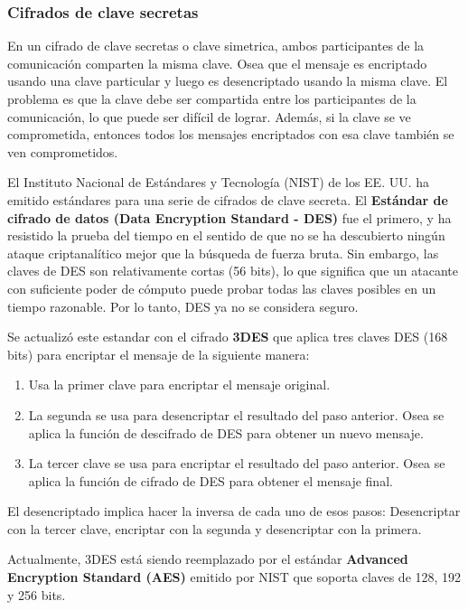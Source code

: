 \subsubsection{Cifrados de clave secretas}
En un cifrado de clave secretas o clave simetrica, ambos participantes de la comunicación comparten la misma clave. Osea que el mensaje es encriptado usando una clave particular y luego es desencriptado usando la misma clave. El problema es que la clave debe ser compartida entre los participantes de la comunicación, lo que puede ser difícil de lograr. Además, si la clave se ve comprometida, entonces todos los mensajes encriptados con esa clave también se ven comprometidos.

El Instituto Nacional de Estándares y Tecnología (NIST) de los EE. UU. ha emitido estándares para una serie de cifrados de clave secreta. El \textbf{Estándar de cifrado de datos (Data Encryption Standard - DES)} fue el primero, y ha resistido la prueba del tiempo en el sentido de que no se ha descubierto ningún ataque criptanalítico mejor que la búsqueda de fuerza bruta. Sin embargo, las claves de DES son relativamente cortas (56 bits), lo que significa que un atacante con suficiente poder de cómputo puede probar todas las claves posibles en un tiempo razonable. Por lo tanto, DES ya no se considera seguro.

Se actualizó este estandar con el cifrado \textbf{3DES} que aplica tres claves DES (168 bits) para encriptar el mensaje de la siguiente manera:
\begin{enumerate}
  \item Usa la primer clave para encriptar el mensaje original.
  \item La segunda se usa para desencriptar el resultado del paso anterior. Osea se aplica la función de descifrado de DES para obtener un nuevo mensaje.
  \item La tercer clave se usa para encriptar el resultado del paso anterior. Osea se aplica la función de cifrado de DES para obtener el mensaje final.
\end{enumerate}

El desencriptado implica hacer la inversa de cada uno de esos pasos: Desencriptar con la tercer clave, encriptar con la segunda y desencriptar con la primera.

Actualmente, 3DES está siendo reemplazado por el estándar \textbf{Advanced Encryption Standard (AES)} emitido por NIST que soporta claves de 128, 192 y 256 bits.


